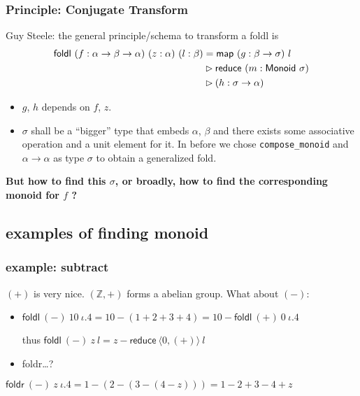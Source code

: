 \documentclass{beamer}
\begin{document}
\begin{frame}
    \frametitle{Principle: Conjugate Transform}
    Guy Steele: the general principle/schema to transform a \textsf{foldl} is
    \begin{align}
        \mathsf{foldl}\ (f: \alpha\to\beta\to\alpha)\ (z: \alpha)\ (l: \beta) & = \mathsf{map}\ (g: \beta\to\sigma)\ l \notag      \\
                                                                              & \rhd \mathsf{reduce}\ (m: \mathsf{Monoid}\ \sigma) \\
                                                                              & \rhd (h: \sigma\to\alpha) \notag
    \end{align}
    \begin{itemize}
        \item $g$, $h$ depends on $f$, $z$.
        \item $\sigma$ shall be a ``bigger'' type that embeds $\alpha$, $\beta$ and there exists some associative operation and a unit element for it.
              In before we chose \texttt{compose\_monoid} and $\alpha\to\alpha$ as type $\sigma$ to obtain a generalized fold.
    \end{itemize}
    \textbf{But how to find this $\sigma$, or broadly, how to find the corresponding monoid for $f$ ?}
\end{frame}
\subsection{examples of finding monoid}
\begin{frame}[fragile]
    \frametitle{example: subtract}
    $(+)$ is very nice. $(\mathbb{Z},+)$ forms a abelian group. What about $(-)$:
    \begin{itemize}
        \item $\mathsf{foldl}\ (-)\ 10\ \iota.4 = 10 - (1 + 2 + 3 + 4) = 10 - \mathsf{foldl}\ (+)\ 0\ \iota.4$

              thus $\mathsf{foldl}\ (-)\ z\ l = z - \mathsf{reduce}\ \langle 0,(+) \rangle\ l$
        \item \textsf{foldr}\dots ?
    \end{itemize}
    $\mathsf{foldr}\ (-)\ z\ \iota.4 = 1 - (2 - (3 - (4 - z))) = 1 - 2 + 3 - 4 + z$
\end{frame}
\end{document}
